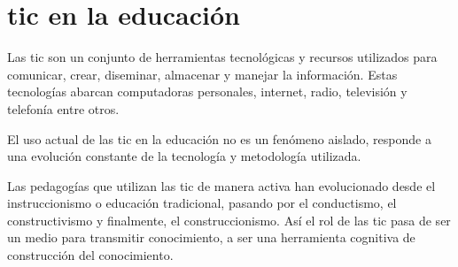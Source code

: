 \section{\Gls{tic} en la educación}

Las \Gls{tic} son un conjunto de herramientas tecnológicas y recursos utilizados
para comunicar, crear, diseminar, almacenar y manejar la
información\cite{unesco:ict}. Estas tecnologías abarcan computadoras personales,
internet, radio, televisión y telefonía\cite{tinio:ict,} entre otros.

El uso actual de las \Gls{tic} en la educación no es un fenómeno aislado,
responde a una evolución constante de la tecnología y metodología
utilizada\cite{egenfeldt2007third}.

Las pedagogías que utilizan las \gls{tic} de manera activa han evolucionado
desde el instruccionismo o educación tradicional, pasando por el conductismo, el
constructivismo y finalmente, el
construccionismo\cite{egenfeldt2007third,white:ict}. Así el rol de las \gls{tic}
pasa de ser un medio para transmitir conocimiento, a ser una herramienta
cognitiva de construcción del
conocimiento\cite{ict:ttc,valdivia:sg,sasha:construtivism}.

